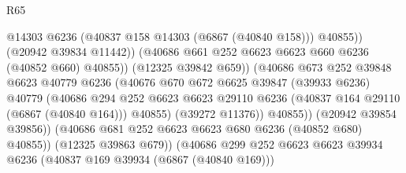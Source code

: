 \begin{lexlean}{R65}
\begin{coremodule}
{                                                @14303
                                                @6236
                                                (@40837 @158 @14303 (@6867 (@40840 @158)))
                                                @40855))
                                            (@20942 @39834 @11442))
                                          (@40686
                                            @661
                                            @252
                                            @6623
                                            @6623
                                            @660
                                            @6236
                                            (@40852 @660)
                                            @40855))
                                        (@12325 @39842 @659))
                                      (@40686
                                        @673
                                        @252
                                        @39848
                                        @6623
                                        @40779
                                        @6236
                                        (@40676
                                          @670
                                          @672
                                          @6625
                                          @39847
                                          (@39933 @6236)
                                          @40779
                                          (@40686
                                            @294
                                            @252
                                            @6623
                                            @6623
                                            @29110
                                            @6236
                                            (@40837 @164 @29110 (@6867 (@40840 @164)))
                                            @40855)
                                          (@39272 @11376))
                                        @40855))
                                    (@20942 @39854 @39856))
                                  (@40686 @681 @252 @6623 @6623 @680 @6236 (@40852 @680) @40855))
                                (@12325 @39863 @679))
                              (@40686
                                @299
                                @252
                                @6623
                                @6623
                                @39934
                                @6236
                                (@40837 @169 @39934 (@6867 (@40840 @169)))
}
\end{coremodule}
\end{lexlean}
